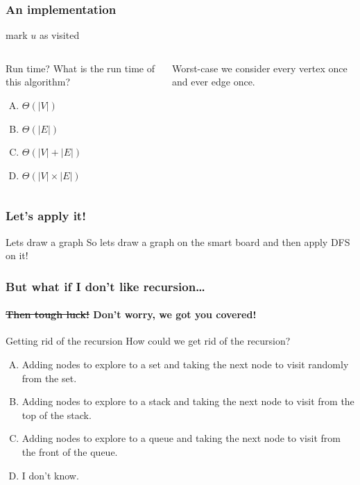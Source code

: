 \begin{frame}
	\frametitle{An implementation}
	
	\begin{algorithmic}
	\pause
	\pause
		\State mark $u$ as visited
	\pause
		\State{}
		\EndIf
		\EndFor
		\EndFunction
	\end{algorithmic}
	\pause
	\begin{columns}
	\begin{questionblock}{Run time?}
		What is the run time of this algorithm?
		\begin{multicols}{2}
		\begin{enumerate}[A.]
			\item $\Theta(|V|)$
			\item $\Theta(|E|)$
			\item $\Theta(|V| + |E|)$
			\item $\Theta(|V|\times|E|)$
		\end{enumerate}
	\end{multicols}
	\end{questionblock}
		\pause
		\begin{answerblock}{}
			Worst-case we consider every vertex once and ever edge once.
		\end{answerblock}
	\end{columns}
\end{frame}

\begin{frame}
	\frametitle{Let's apply it!}

	\begin{problemblock}{Lets draw a graph}
		So lets draw a graph on the smart board and then apply DFS on it!
	\end{problemblock}
\end{frame}

\begin{frame}
	\frametitle{But what if I don't like recursion\dots}
	\framesubtitle{\st{Then tough luck!} Don't worry, we got you covered!}

	\begin{questionblock}{Getting rid of the recursion}
		How could we get rid of the recursion?
		\begin{enumerate}[A.]
			\item Adding nodes to explore to a set and taking the next node to visit randomly from the set.
			\item Adding nodes to explore to a stack and taking the next node to visit from the top of the stack.
			\item Adding nodes to explore to a queue and taking the next node to visit from the front of the queue.
			\item I don't know.
		\end{enumerate}
	\end{questionblock}
\end{frame}

